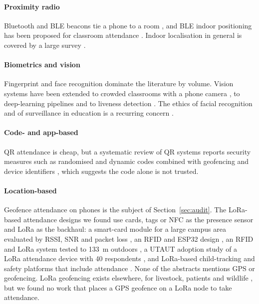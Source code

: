 \documentclass[preprint,12pt]{elsarticle}
\begin{document}
\paragraph{Proximity radio} Bluetooth and BLE beacons tie a phone to a room \cite{noguchi2015student,lodha2015bluetooth}, and BLE indoor positioning has been proposed for classroom attendance \cite{puckdeevongs2020classroom}. Indoor localisation in general is covered by a large survey \cite{zafari2019survey}.

\paragraph{Biometrics and vision} Fingerprint \cite{mohamed2012fingerprint,mittal2015fingerprint,zainal2014design} and face recognition \cite{bah2020improved,arsenovic2017facetime,wagh2015attendance,sunaryono2021android,alhanaee2021face} dominate the literature by volume. Vision systems have been extended to crowded classrooms with a phone camera \cite{mery2019student}, to deep-learning pipelines \cite{fu2017university} and to liveness detection \cite{surantha2024lightweight}. The ethics of facial recognition and of surveillance in education is a recurring concern \cite{almeida2021ethics,pea2022four}.

\paragraph{Code- and app-based} QR attendance \cite{masalha2014students} is cheap, but a systematic review of QR systems reports security measures such as randomised and dynamic codes combined with geofencing and device identifiers \cite{jodihendrawan2025code}, which suggests the code alone is not trusted.

\paragraph{Location-based} Geofence attendance on phones is the subject of Section~\ref{sec:audit}. The LoRa-based attendance designs we found use cards, tags or NFC as the presence sensor and LoRa as the backhaul: a smart-card module for a large campus area evaluated by RSSI, SNR and packet loss \cite{noprianto2023application}, an RFID and ESP32 design \cite{karuppanan2026digitalized}, an RFID and LoRa system tested to 133~m outdoors \cite{khurshid2025fusion}, a UTAUT adoption study of a LoRa attendance device with 40 respondents \cite{seta2023adoption}, and LoRa-based child-tracking and safety platforms that include attendance \cite{ztrk2019design,s2024safecomm}. None of the abstracts mentions GPS or geofencing. LoRa geofencing exists elsewhere, for livestock, patients and wildlife \cite{ahmed2024scalable,j2026fencing,andika2026lora,lopezescobar2025wildlife}, but we found no work that places a GPS geofence on a LoRa node to take attendance.
\end{document}
